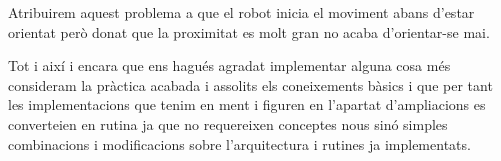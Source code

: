 Atribuirem aquest problema a que el robot inicia el moviment abans d'estar orientat però donat que la
proximitat es molt gran no acaba d'orientar-se mai.


Tot i així i encara que ens hagués agradat implementar alguna cosa més consideram la pràctica acabada
i assolits els coneixements bàsics i que per tant les implementacions que tenim en ment i figuren en l'apartat
d'ampliacions es converteien en rutina ja que no requereixen conceptes nous sinó simples combinacions i modificacions 
sobre l'arquitectura i rutines ja implementats.